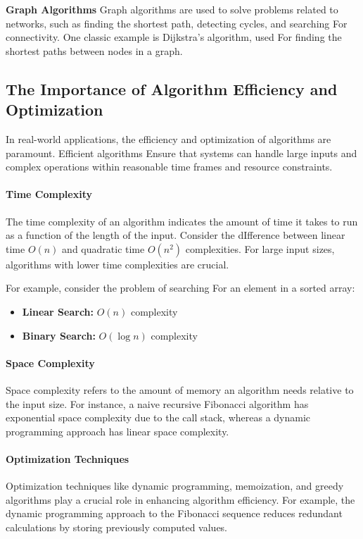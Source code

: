 \documentclass[12pt]{book} %
\begin{document}
\textbf{Graph Algorithms}
Graph algorithms are used to solve problems related to networks, such as finding the shortest path, detecting cycles, and searching For connectivity. One classic example is Dijkstra's algorithm, used For finding the shortest paths between nodes in a graph.


\subsection{The Importance of Algorithm Efficiency and Optimization}
In real-world applications, the efficiency and optimization of algorithms are paramount. Efficient algorithms Ensure that systems can handle large inputs and complex operations within reasonable time frames and resource constraints.

\paragraph{Time Complexity}
The time complexity of an algorithm indicates the amount of time it takes to run as a function of the length of the input. Consider the dIfference between linear time $O(n)$ and quadratic time $O(n^2)$ complexities. For large input sizes, algorithms with lower time complexities are crucial.

For example, consider the problem of searching For an element in a sorted array:
\begin{itemize}
    \item \textbf{Linear Search:} $O(n)$ complexity
    \item \textbf{Binary Search:} $O(\log n)$ complexity
\end{itemize}

\paragraph{Space Complexity}
Space complexity refers to the amount of memory an algorithm needs relative to the input size. For instance, a naive recursive Fibonacci algorithm has exponential space complexity due to the call stack, whereas a dynamic programming approach has linear space complexity.

\paragraph{Optimization Techniques}
Optimization techniques like dynamic programming, memoization, and greedy algorithms play a crucial role in enhancing algorithm efficiency. For example, the dynamic programming approach to the Fibonacci sequence reduces redundant calculations by storing previously computed values.
\end{document}
